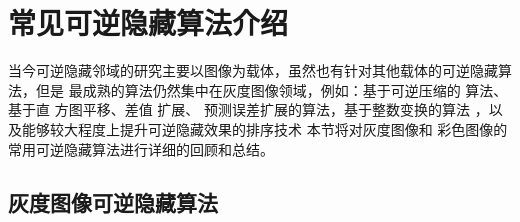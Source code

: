﻿\chapter{常见可逆隐藏算法介绍}
\label{chap:related_intro}
当今可逆隐藏邻域的研究主要以图像为载体，虽然也有针对其他载体的可逆隐藏算法，但是
最成熟的算法仍然集中在灰度图像领域，例如：基于可逆压缩的
算法\cite{fridrich2001invertible,celik2005lossless}、基于直
方图平移\cite{ni2006reversible,lee2006reversiblee,li2013general}、差值
扩展\cite{tian2003reversible,alattar2003reversible,alattar2004reversible,alattar2004reversible}、
预测误差扩展的算法\cite{thodi2007expansion}，基于整数变换的算法
\cite{coltuc2007very,chen2010reversible,wang2010efficient,peng2012adaptive}，以
及能够较大程度上提升可逆隐藏效果的排序技术
\cite{kamstra2005reversible,sachnev2009reversible}本节将对灰度图像和
彩色图像的常用可逆隐藏算法进行详细的回顾和总结。



\section{灰度图像可逆隐藏算法}
